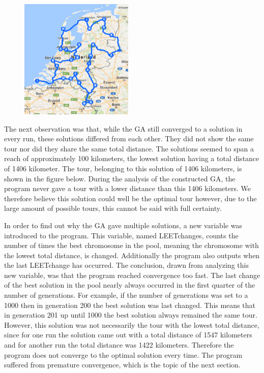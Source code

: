 \begin{figure}
	\vspace{-1cm}
	\begin{center}
		\includegraphics[width=0.48\textwidth]{1406tour}
	\end{center}	
	\label{1406tour}
\end{figure}

The next observation was that, while the GA still converged to a solution in every run, these solutions differed from each other. They did not show the same tour nor did they share the same total distance. The solutions seemed to span a reach of approximately 100 kilometers, the lowest solution having a total distance of 1406 kilometer. The tour, belonging to this solution of 1406 kilometers, is shown in the figure below. During the analysis of the constructed GA, the program never gave a tour with a lower distance than this 1406 kilometers. We therefore believe this solution could well be the optimal tour however, due to the large amount of possible tours, this cannot be said with full certainty. 

\par
In order to find out why the GA gave multiple solutions, a new variable was introduced to the program. This variable, named LEETchanges, counts the number of times the best chromosome in the pool, meaning the chromosome with the lowest total distance, is changed. Additionally the program also outputs when the last LEETchange has occurred. The conclusion, drawn from analyzing this new variable, was that the program reached convergence too fast. The last change of the best solution in the pool nearly always occurred in the first quarter of the number of generations. For example, if the number of generations was set to a 1000 then in generation 200 the best solution was last changed. This means that in generation 201 up until 1000 the best solution always remained the same tour. However, this solution was not necessarily the tour with the lowest total distance, since for one run the solution came out with a total distance of 1547 kilometers and for another run the total distance was 1422 kilometers. Therefore the program does not converge to the optimal solution every time. The program suffered from premature convergence, which is the topic of the next section. 

